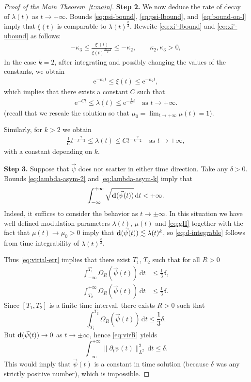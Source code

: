\documentclass[10pt,reqno]{amsart}
\newcommand{\EQ}[1]{\begin{equation}\begin{split} #1 \end{split}\end{equation}}
\numberwithin{equation}{section}
\theoremstyle{remark}
\newcommand{\ud}{\mathrm{d}}
\newcommand{\0}{\emptyset}
\newcommand{\bfd}{{\bf d}}
\begin{document}
\begin{proof}[Proof of the Main Theorem~\ref{t:main}]
\noindent
\textbf{Step 2.}
We now deduce the rate of decay of $\lambda(t)$ as $t \to +\infty$.
Bounds \eqref{eq:psi-bound},  \eqref{eq:psi-lbound}, and~\eqref{eq:bound-on-l} imply that $\xi(t)$
is comparable to $\lambda(t)^\frac k2$.
Rewrite \eqref{eq:xi'-lbound} and \eqref{eq:xi'-ubound} as follows:
\EQ{
-\kappa_3 \leq \frac{\xi'(t)}{\xi(t)^\frac{2k-2}{k}} \leq -\kappa_2, \qquad \kappa_2, \kappa_3 > 0,
}
In the case $k = 2$, after integrating and possibly changing the values of the constants, we obtain
\EQ{
\mathrm e^{-\kappa_3 t} \leq \xi(t) \leq \mathrm e^{-\kappa_2 t},
}
which implies that there exists a constant $C$ such that
\EQ{\label{eq:lambda-asym-2}
\mathrm e^{-C t} \leq \lambda(t) \leq \mathrm e^{-\frac{1}{C} t}\quad \text{as }t \to +\infty.
}
(recall that we rescale the solution so that $\mu_0 = \lim_{t\to +\infty}\mu(t) = 1$).

Similarly, for $k > 2$ we obtain
\EQ{\label{eq:lambda-asym-k}
\frac 1C t^{-\frac{2}{k-2}} \leq \lambda(t) \leq C t^{-\frac{2}{k-2}}\quad \text{as }t \to +\infty,
}
with a constant depending on $k$.

\noindent
\textbf{Step 3.}
Suppose that $\vec\psi$ does not scatter in either time direction.
Take any $\delta > 0$.
Bounds \eqref{eq:lambda-asym-2} and \eqref{eq:lambda-asym-k} imply that
\EQ{\label{eq:d-integrable}
\int_{-\infty}^{+\infty}\sqrt{\bfd(\vec\psi(t))}\,\ud t < +\infty.
}
Indeed, it suffices to consider the behavior as $t \to \pm\infty$.
In this situation we have well-defined modulation parameters $\lambda(t)$, $\mu(t)$
and \eqref{eq:gH} together with the fact that $\mu(t)\to \mu_0 > 0$ imply that
$\bfd(\vec\psi(t)) \lesssim \lambda(t)^k$,
so \eqref{eq:d-integrable} follows from time integrability of $\lambda(t)^{\frac k2}$.

Thus \eqref{eq:virial-err} implies that there exist $T_1$, $T_2$ such that for all $R > 0$
\begin{align}
  \int_{-\infty}^{T_1} \Omega_R(\vec\psi(t))\,\ud t &\leq \frac 13\delta, \\
  \int_{T_2}^{+\infty} \Omega_R(\vec\psi(t))\,\ud t &\leq \frac 13\delta.
\end{align}
Since $[T_1, T_2]$ is a finite time interval, there exists $R > 0$ such that
\begin{equation}
  \int_{T_1}^{T_2}\Omega_R(\vec\psi(t))\,\ud t \leq \frac 13\delta.
\end{equation}
But $\bfd(\vec\psi(t)) \to 0$ as $t \to \pm\infty$, hence \eqref{eq:virR} yields
\begin{equation}
  \int_{-\infty}^{+\infty}\|\partial_t \psi(t)\|_{L^2}^2\,\ud t \leq \delta.
\end{equation}
This would imply that $\vec\psi(t)$ is a constant in time solution
(because $\delta$ was any strictly positive number), which is impossible.
\end{proof}
\end{document}
